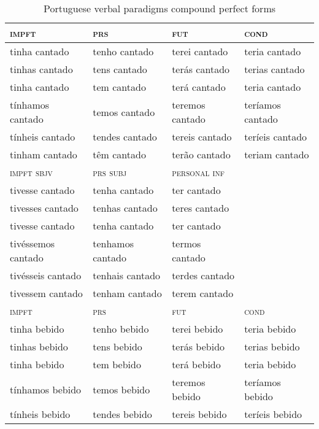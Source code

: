 \documentclass[output=paper,colorlinks,citecolor=brown]{langscibook}
\begin{document}
\begin{table}[H]
\small
\caption{Portuguese verbal paradigms compound perfect forms}
\begin{tabular}{llll}
\lsptoprule
\textsc{impft}&\textsc{prs}&\textsc{fut}& \textsc{cond}\\
\midrule
tinha	 cantado &tenho	 cantado &terei	 cantado & teria cantado \\
tinhas	 cantado &tens	 cantado &terás	 cantado & terias cantado \\
tinha	 cantado &tem	 cantado &terá	 cantado & teria cantado \\
tínhamos cantado &temos  cantado &teremos cantado & teríamos cantado \\
tínheis cantado &tendes  cantado &tereis	 cantado & teríeis cantado \\
tinham	 cantado &têm     cantado &terão	 cantado & teriam cantado \\
\midrule
\textsc{impft} \textsc{sbjv}&   \textsc{prs subj}&\textsc{personal} \textsc{inf}\\
\midrule
                         tivesse	 cantado &tenha     cantado & ter     cantado &               \\
                         tivesses 	 cantado &tenhas    cantado & teres   cantado &        \\
                         tivesse	 cantado &tenha     cantado & ter     cantado &            \\
                         tivéssemos	 cantado &tenhamos  cantado & termos  cantado &         \\
                         tivésseis	 cantado &tenhais   cantado & terdes  cantado &         	\\
                         tivessem	 cantado &tenham	   cantado & terem   cantado &          \\
\midrule
\textsc{impft}&\textsc{prs}&\textsc{fut}& \textsc{cond}\\
\midrule
                   	tinha	  bebido &tenho	  bebido &terei	  bebido & teria  bebido \\
                	tinhas	  bebido &tens	  bebido &terás	  bebido & terias  bebido \\
                	tinha	  bebido &tem	  bebido &terá	  bebido & teria  bebido \\
                	tínhamos  bebido &temos   bebido &teremos  bebido & teríamos  bebido \\
                	tínheis  bebido &tendes   bebido &tereis	  bebido & teríeis  bebido \\

\end{tabular}
\end{table}
\end{document}
